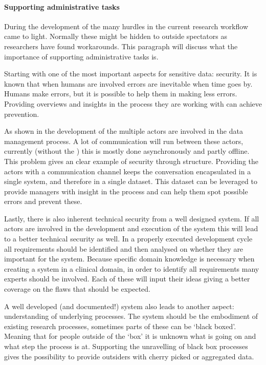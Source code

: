 
\paragraph{Supporting administrative tasks}

During the development of the \ivfsystem{} many hurdles in the current research workflow came to light.
Normally these might be hidden to outside spectators as researchers have found workarounds.
This paragraph will discuss what the importance of supporting administrative tasks is.

Starting with one of the most important aspects for sensitive data: security.
It is known that when humans are involved errors are inevitable when time goes by.
Humans make errors, but it is possible to help them in making less errors.
Providing overviews and insights in the process they are working with can achieve prevention.

As shown in the development of the \ivfsystem{} multiple actors are involved in the data management process.
A lot of communication will run between these actors, currently (without the \ivfsystem{}) this is mostly done asynchronously and partly offline.
This problem gives an clear example of security through structure.
Providing the actors with a communication channel keeps the conversation encapsulated in a single system, and therefore in a single dataset.
This dataset can be leveraged to provide managers with insight in the process and can help them spot possible errors and prevent these.

Lastly, there is also inherent technical security from a well designed system.
If all actors are involved in the development and execution of the system this will lead to a better technical security as well.
In a properly executed development cycle all requirements should be identified and then analysed on whether they are important for the system.
Because specific domain knowledge is necessary when creating a system in a clinical domain, in order to identify all requirements many experts should be involved.
Each of these will input their ideas giving a better coverage on the flaws that should be expected.

A well developed (and documented!) system also leads to another aspect: understanding of underlying processes.
The system should be the embodiment of existing research processes, sometimes parts of these can be `black boxed'.
Meaning that for people outside of the `box' it is unknown what is going on and what step the process is at.
Supporting the unravelling of black box processes gives the possibility to provide outsiders with cherry picked or aggregated data.

